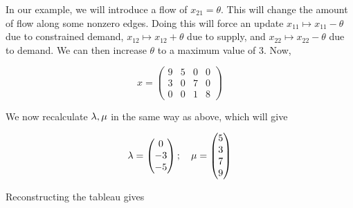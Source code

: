 In our example, we will introduce a flow of \( x_{21} = \theta \).
This will change the amount of flow along some nonzero edges.
Doing this will force an update \( x_{11} \mapsto x_{11} - \theta \) due to constrained demand, \( x_{12} \mapsto x_{12} + \theta \) due to supply, and \( x_{22} \mapsto x_{22} - \theta \) due to demand.
We can then increase \( \theta \) to a maximum value of \( 3 \).
Now,

\[ x = \begin{pmatrix}
    9 & 5 & 0 & 0 \\
    3 & 0 & 7 & 0 \\
    0 & 0 & 1 & 8
\end{pmatrix} \]

\noindent We now recalculate \( \vb\lambda,\vb\mu \) in the same way as above, which will give

\[ \vb\lambda = \begin{pmatrix}
    0\\-3\\-5
\end{pmatrix};\quad \vb\mu = \begin{pmatrix}
    5\\3\\7\\9
\end{pmatrix} \]

\noindent Reconstructing the tableau gives

